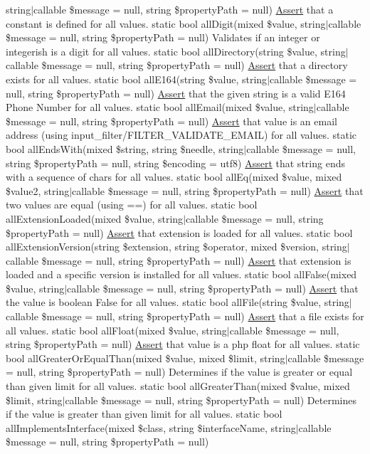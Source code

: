 string$\vert$callable \$message = null, string \$property\+Path = null) \mbox{\hyperlink{class_assert_1_1_assert}{Assert}} that a constant is defined for all values.  static bool all\+Digit(mixed \$value, string$\vert$callable \$message = null, string \$property\+Path = null) Validates if an integer or integerish is a digit for all values.  static bool all\+Directory(string \$value, string$\vert$callable \$message = null, string \$property\+Path = null) \mbox{\hyperlink{class_assert_1_1_assert}{Assert}} that a directory exists for all values.  static bool all\+E164(string \$value, string$\vert$callable \$message = null, string \$property\+Path = null) \mbox{\hyperlink{class_assert_1_1_assert}{Assert}} that the given string is a valid E164 Phone Number for all values.  static bool all\+Email(mixed \$value, string$\vert$callable \$message = null, string \$property\+Path = null) \mbox{\hyperlink{class_assert_1_1_assert}{Assert}} that value is an email address (using input\+\_\+filter/\+F\+I\+L\+T\+E\+R\+\_\+\+V\+A\+L\+I\+D\+A\+T\+E\+\_\+\+E\+M\+A\+IL) for all values.  static bool all\+Ends\+With(mixed \$string, string \$needle, string$\vert$callable \$message = null, string \$property\+Path = null, string \$encoding = \textquotesingle{}utf8\textquotesingle{}) \mbox{\hyperlink{class_assert_1_1_assert}{Assert}} that string ends with a sequence of chars for all values.  static bool all\+Eq(mixed \$value, mixed \$value2, string$\vert$callable \$message = null, string \$property\+Path = null) \mbox{\hyperlink{class_assert_1_1_assert}{Assert}} that two values are equal (using ==) for all values.  static bool all\+Extension\+Loaded(mixed \$value, string$\vert$callable \$message = null, string \$property\+Path = null) \mbox{\hyperlink{class_assert_1_1_assert}{Assert}} that extension is loaded for all values.  static bool all\+Extension\+Version(string \$extension, string \$operator, mixed \$version, string$\vert$callable \$message = null, string \$property\+Path = null) \mbox{\hyperlink{class_assert_1_1_assert}{Assert}} that extension is loaded and a specific version is installed for all values.  static bool all\+False(mixed \$value, string$\vert$callable \$message = null, string \$property\+Path = null) \mbox{\hyperlink{class_assert_1_1_assert}{Assert}} that the value is boolean False for all values.  static bool all\+File(string \$value, string$\vert$callable \$message = null, string \$property\+Path = null) \mbox{\hyperlink{class_assert_1_1_assert}{Assert}} that a file exists for all values.  static bool all\+Float(mixed \$value, string$\vert$callable \$message = null, string \$property\+Path = null) \mbox{\hyperlink{class_assert_1_1_assert}{Assert}} that value is a php float for all values.  static bool all\+Greater\+Or\+Equal\+Than(mixed \$value, mixed \$limit, string$\vert$callable \$message = null, string \$property\+Path = null) Determines if the value is greater or equal than given limit for all values.  static bool all\+Greater\+Than(mixed \$value, mixed \$limit, string$\vert$callable \$message = null, string \$property\+Path = null) Determines if the value is greater than given limit for all values.  static bool all\+Implements\+Interface(mixed \$class, string \$interface\+Name, string$\vert$callable \$message = null, string \$property\+Path = null) 